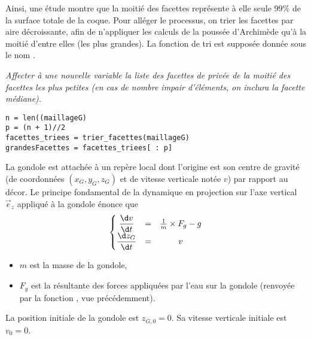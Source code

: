 Ainsi, une étude montre que la moitié des facettes représente à elle seule 99\% de la surface totale  de la coque. Pour alléger le processus, on trier les facettes par aire décroissante, afin de n’appliquer les calculs de la poussée d’Archimède qu'à la moitié d’entre elles (les plus grandes). La fonction de tri est supposée donnée sous le nom .
\begin{Exercise}\it 
 Affecter à une nouvelle variable  la liste des facettes de privée de la moitié des facettes les plus petites (en cas de nombre impair d’éléments, on inclura la facette médiane).
\end{Exercise}
\begin{Answer}
\begin{lstlisting}
n = len((maillageG)
p = (n + 1)//2
facettes_triees = trier_facettes(maillageG)
grandesFacettes = facettes_triees[ : p]
\end{lstlisting}
\end{Answer}

\medskip

La gondole est attachée à un repère local dont l’origine est son centre de gravité (de coordonnées $(x_G ,y_G ,z_G)$ et de vitesse verticale notée $v$) par rapport au décor. Le principe fondamental de la dynamique en projection sur l’axe vertical $\vec e_z$ appliqué à la gondole énonce que 
\[\left\{\begin{matrix}
\displaystyle \frac{\d v}{\d t} &=&\frac 1m\times F_g - g\\ 
\displaystyle \frac{\d z_G}{\d t} &=& v\\ 
\end{matrix}\right.\]
\begin{itemize}
    \item $m$ est la masse de la gondole,
    \item $F_g$ est la résultante des forces appliquées par l’eau sur la gondole (renvoyée par la fonction , vue précédemment).
\end{itemize}
La position initiale de la gondole est $z_{G,0} = 0$. Sa vitesse verticale initiale est $v_0 = 0$.

